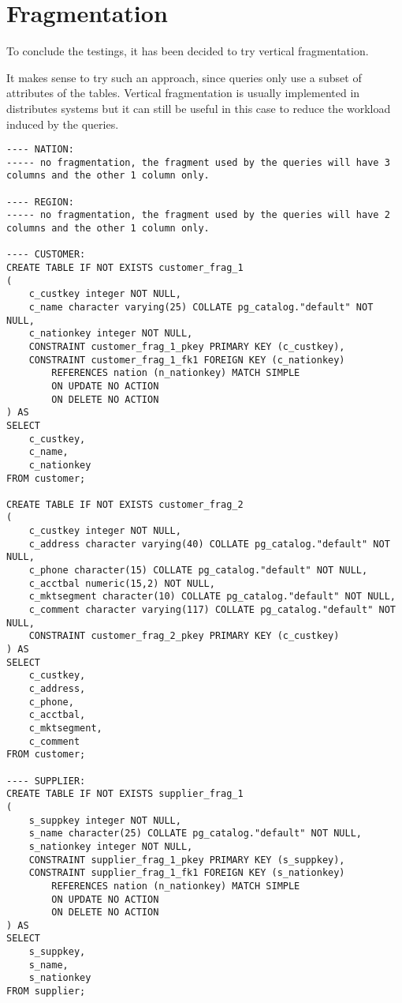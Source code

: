 

\section{Fragmentation}
\label{sec:fragmentation}

To conclude the testings, it has been decided to try vertical fragmentation.

It makes sense to try such an approach, since queries only use a subset of attributes of the tables. Vertical fragmentation is usually implemented in distributes systems but it can still be useful in this case to reduce the workload induced by the queries.

\begin{lstlisting}
---- NATION: 
----- no fragmentation, the fragment used by the queries will have 3 columns and the other 1 column only.

---- REGION:
----- no fragmentation, the fragment used by the queries will have 2 columns and the other 1 column only.

---- CUSTOMER:
CREATE TABLE IF NOT EXISTS customer_frag_1
(
    c_custkey integer NOT NULL,
    c_name character varying(25) COLLATE pg_catalog."default" NOT NULL,
    c_nationkey integer NOT NULL,
    CONSTRAINT customer_frag_1_pkey PRIMARY KEY (c_custkey),
    CONSTRAINT customer_frag_1_fk1 FOREIGN KEY (c_nationkey)
        REFERENCES nation (n_nationkey) MATCH SIMPLE
        ON UPDATE NO ACTION
        ON DELETE NO ACTION
) AS
SELECT
	c_custkey,
	c_name,
	c_nationkey
FROM customer;

CREATE TABLE IF NOT EXISTS customer_frag_2
(
	c_custkey integer NOT NULL,
    c_address character varying(40) COLLATE pg_catalog."default" NOT NULL,
    c_phone character(15) COLLATE pg_catalog."default" NOT NULL,
    c_acctbal numeric(15,2) NOT NULL,
    c_mktsegment character(10) COLLATE pg_catalog."default" NOT NULL,
    c_comment character varying(117) COLLATE pg_catalog."default" NOT NULL,
    CONSTRAINT customer_frag_2_pkey PRIMARY KEY (c_custkey)
) AS
SELECT
	c_custkey,
	c_address,
	c_phone,
	c_acctbal,
	c_mktsegment,
	c_comment
FROM customer;

---- SUPPLIER:
CREATE TABLE IF NOT EXISTS supplier_frag_1
(
    s_suppkey integer NOT NULL,
    s_name character(25) COLLATE pg_catalog."default" NOT NULL,
    s_nationkey integer NOT NULL,
    CONSTRAINT supplier_frag_1_pkey PRIMARY KEY (s_suppkey),
    CONSTRAINT supplier_frag_1_fk1 FOREIGN KEY (s_nationkey)
        REFERENCES nation (n_nationkey) MATCH SIMPLE
        ON UPDATE NO ACTION
        ON DELETE NO ACTION
) AS
SELECT
	s_suppkey,
	s_name,
	s_nationkey
FROM supplier;


\end{lstlisting}
